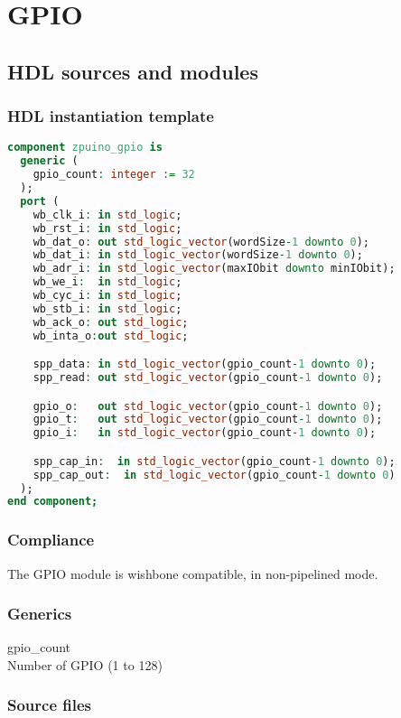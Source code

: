 \section{GPIO}
\subsection{HDL sources and modules}

\subsubsection{HDL instantiation template}
\begin{lstlisting}[language=VHDL]
component zpuino_gpio is
  generic (
    gpio_count: integer := 32
  );
  port (
    wb_clk_i: in std_logic;
    wb_rst_i: in std_logic;
    wb_dat_o: out std_logic_vector(wordSize-1 downto 0);
    wb_dat_i: in std_logic_vector(wordSize-1 downto 0);
    wb_adr_i: in std_logic_vector(maxIObit downto minIObit);
    wb_we_i:  in std_logic;
    wb_cyc_i: in std_logic;
    wb_stb_i: in std_logic;
    wb_ack_o: out std_logic;
    wb_inta_o:out std_logic;

    spp_data: in std_logic_vector(gpio_count-1 downto 0);
    spp_read: out std_logic_vector(gpio_count-1 downto 0);

    gpio_o:   out std_logic_vector(gpio_count-1 downto 0);
    gpio_t:   out std_logic_vector(gpio_count-1 downto 0);
    gpio_i:   in std_logic_vector(gpio_count-1 downto 0);

    spp_cap_in:  in std_logic_vector(gpio_count-1 downto 0);
    spp_cap_out:  in std_logic_vector(gpio_count-1 downto 0)
  );
end component;
\end{lstlisting}
\subsubsection{Compliance}
The GPIO module is wishbone compatible, in non-pipelined mode.
\subsubsection{Generics}

\begin{description}
\item{gpio\_count} \hfill \\ 
Number of GPIO (1 to 128)
\end{description}

\subsubsection{Source files}

